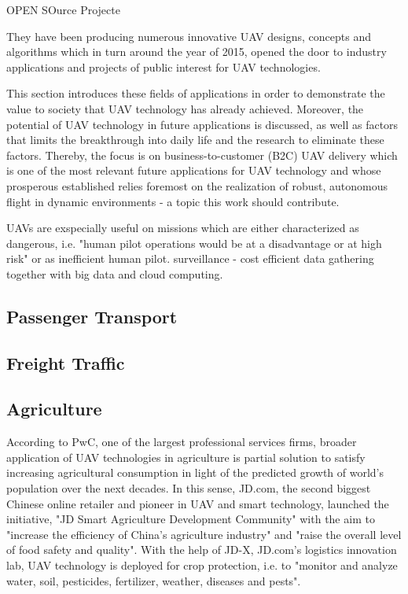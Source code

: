 
OPEN SOurce Projecte

They have been producing
numerous innovative
UAV designs, concepts and algorithms
which in turn around
the year of 2015, opened the door
to industry applications
and projects of public interest
for UAV technologies.

This section introduces these
fields of applications in order
to demonstrate the value to society
that UAV technology has already achieved.
Moreover, the potential of UAV technology
in future applications is discussed,
as well as factors that limits the 
breakthrough into daily life
and the research to eliminate these factors.
Thereby, the focus is on 
business-to-customer (B2C) UAV delivery
which is one of the most relevant future applications
for UAV technology and whose prosperous 
established relies foremost 
on the realization of robust,
autonomous flight in dynamic environments -
a topic this work should contribute.


UAVs are exspecially useful on missions
which are either characterized 
as dangerous, 
i.e. "human pilot operations would be at a disadvantage or at high risk"
\cite{Watts2012}
or as inefficient
human pilot.
surveillance - 
cost efficient data gathering together with big data and cloud computing.




\subsection{Passenger Transport}


\subsection{Freight Traffic}

\subsection{Agriculture}

According to PwC, one of the largest professional services firms,
broader application of UAV technologies in agriculture 
is partial solution to satisfy 
increasing agricultural consumption
in light of the predicted growth of world's population
over the next decades.
In this sense, JD.com,
the second biggest Chinese online retailer
and pioneer in UAV and smart technology,
launched the initiative,
"JD Smart Agriculture Development Community"
with the aim to
"increase the efficiency of China’s agriculture industry" and
"raise the overall level of food safety and quality".
With the help of 
JD-X, JD.com’s logistics innovation lab,
UAV technology is deployed for
crop protection, i.e. to 
"monitor and analyze water, soil, pesticides, fertilizer, weather, diseases and pests".




